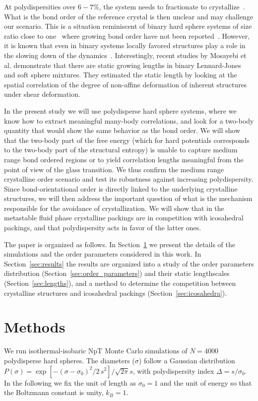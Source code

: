\documentclass[twocolumn,superscriptaddress]{revtex4}
\begin{document}
At polydispersities over $6-7\%$, the system needs to fractionate to crystallize~\citep{Fasolo2003}. What is the bond order of the reference crystal is then unclear and may challenge our scenario. This is a situation reminiscent of binary hard sphere systems of size ratio close to one~\cite{Hopkins2011b,Hopkins2012} where growing bond order have not been reported~\cite{Charbonneau}. However, it is known that even in binary systems locally favored structures play a role in the slowing down of the dynamics~\cite{Coslovich2011,Malins2012}. Interestingly, recent studies by Mosayebi et al. \cite{mosayebi2010,mosayebi2012} demonstrate that there are static growing lengths 
in binary Lennard-Jones and soft sphere mixtures. They estimated the static length by looking at the spatial correlation of the degree of non-affine deformation 
of inherent structures under shear deformation. 

In the present study we will use polydisperse hard sphere systems, where we know how to extract meaningful many-body correlations, and look for a two-body quantity that would show the same behavior as the bond order. We will show that the two-body part of the free energy (which for hard potentials corresponds to the two-body part of the structural entropy) is unable to capture medium range bond ordered regions or to yield correlation lengths meaningful from the point of view of the glass transition. We thus confirm the medium range crystalline order scenario and test its robustness against increasing polydispersity.
Since bond-orientational order is directly linked to the underlying crystalline structures, we will then address the important question
of what is the mechanism responsible for the avoidance of crystallization. We will show that in the metastable fluid phase crystalline packings
are in competition with icosahedral packings, and that polydispersity acts in favor of the latter ones.

The paper is organized as follows. In Section~\ref{sec:methods} we present the details of the simulations and the order parameters considered in this work. In Section~\ref{sec:results} the results are organized into
a study of the order parameters distribution (Section~\ref{sec:order_parameters}) and their static lengthscales (Section~\ref{sec:lengths}), and a method to determine the competition between crystalline structures
and icosahedral packings (Section~\ref{sec:icosahedra}).

\section{Methods}\label{sec:methods}
We run isothermal-isobaric NpT Monte Carlo simulations of $N=4000$ polydisperse hard spheres.
The diameters ($\sigma$) follow a Gaussian distribution $P(\sigma)=\exp{\left[-(\sigma-\sigma_0)^2/2\,s^2\right]}/\sqrt{2\pi} s$,
with polydispersity index $\Delta=s/\sigma_0$. In the following we fix the unit of length as $\sigma_0=1$ and the unit
of energy so that the Boltzmann constant is unity, $k_B=1$.
\end{document}
